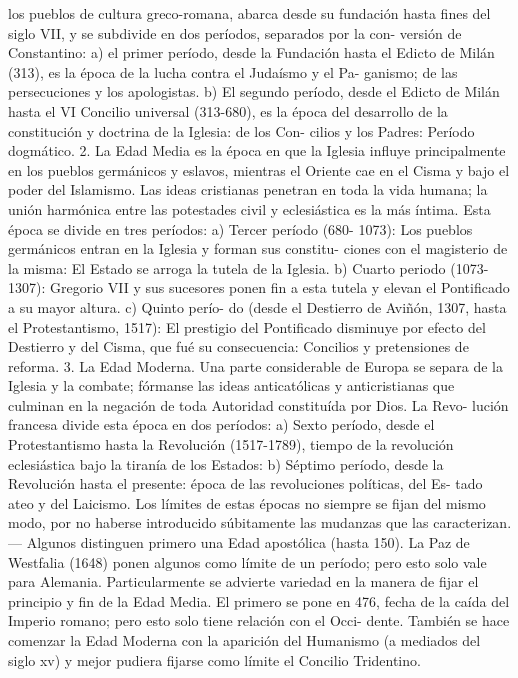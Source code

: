 \raggedbottom{} \documentclass[12pt, a4paper]{book}
\begin{document}
los pueblos de cultura greco-romana, abarca desde su fundación hasta
fines del siglo VII, y se subdivide en dos períodos, separados por la con-
versión de Constantino: a) el primer período, desde la Fundación hasta el
Edicto de Milán (313), es la época de la lucha contra el Judaísmo y el Pa-
ganismo; de las persecuciones y los apologistas. b) El segundo período,
desde el Edicto de Milán hasta el VI Concilio universal (313-680), es la
época del desarrollo de la constitución y doctrina de la Iglesia: de los Con-
cilios y los Padres: Período dogmático.
2. La Edad Media es la época en que la Iglesia influye principalmente
en los pueblos germánicos y eslavos, mientras el Oriente cae en el Cisma
y bajo el poder del Islamismo. Las ideas cristianas penetran en toda la vida
humana; la unión harmónica entre las potestades civil y eclesiástica es la
más íntima. Esta época se divide en tres períodos: a) Tercer período (680-
1073): Los pueblos germánicos entran en la Iglesia y forman sus constitu-
ciones con el magisterio de la misma: El Estado se arroga la tutela de la
Iglesia. b) Cuarto periodo (1073-1307): Gregorio VII y sus sucesores ponen
fin a esta tutela y elevan el Pontificado a su mayor altura. c) Quinto perío-
do (desde el Destierro de Aviñón, 1307, hasta el Protestantismo, 1517): El
prestigio del Pontificado disminuye por efecto del Destierro y del Cisma,
que fué su consecuencia: Concilios y pretensiones de reforma.
3. La Edad Moderna. Una parte considerable de Europa se separa de
la Iglesia y la combate; fórmanse las ideas anticatólicas y anticristianas que
culminan en la negación de toda Autoridad constituída por Dios. La Revo-
lución francesa divide esta época en dos períodos: a) Sexto período, desde
el Protestantismo hasta la Revolución (1517-1789), tiempo de la revolución
eclesiástica bajo la tiranía de los Estados: b) Séptimo período, desde la
Revolución hasta el presente: época de las revoluciones políticas, del Es-
tado ateo y del Laicismo.
Los límites de estas épocas no siempre se fijan del mismo modo, por no
haberse introducido súbitamente las mudanzas que las caracterizan.—
Algunos distinguen primero una Edad apostólica (hasta 150). La Paz de
Westfalia (1648) ponen algunos como límite de un período; pero esto solo
vale para Alemania. Particularmente se advierte variedad en la manera de
fijar el principio y fin de la Edad Media. El primero se pone en 476, fecha
de la caída del Imperio romano; pero esto solo tiene relación con el Occi-
dente. También se hace comenzar la Edad Moderna con la aparición del
Humanismo (a mediados del siglo xv) y mejor pudiera fijarse como límite
el Concilio Tridentino.
\end{document}
